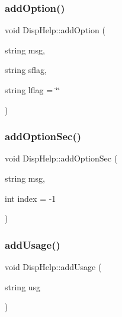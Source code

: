 \mbox{\label{class_disp_help_abc0fb5858d688e9664880cfb130670a9}} 
\subsubsection{\texorpdfstring{addOption()}{addOption()}}
{\footnotesize\ttfamily void Disp\+Help\+::add\+Option (\begin{DoxyParamCaption}\item[{string}]{msg,  }\item[{string}]{sflag,  }\item[{string}]{lflag = {\ttfamily \char`\"{}\char`\"{}} }\end{DoxyParamCaption})}

\mbox{\label{class_disp_help_ad79dc98aa0e2c5cc4053a39edf0ecc6b}} 
\subsubsection{\texorpdfstring{addOptionSec()}{addOptionSec()}}
{\footnotesize\ttfamily void Disp\+Help\+::add\+Option\+Sec (\begin{DoxyParamCaption}\item[{string}]{msg,  }\item[{int}]{index = {\ttfamily -\/1} }\end{DoxyParamCaption})}

\mbox{\label{class_disp_help_ab92ccbc848ad51f388ac6dfb8bc6e0ac}} 
\subsubsection{\texorpdfstring{addUsage()}{addUsage()}}
{\footnotesize\ttfamily void Disp\+Help\+::add\+Usage (\begin{DoxyParamCaption}\item[{string}]{usg }\end{DoxyParamCaption})}

\mbox{\label{class_disp_help_ad37e27be9fe71c39950b27e9dd282ce7}} 

